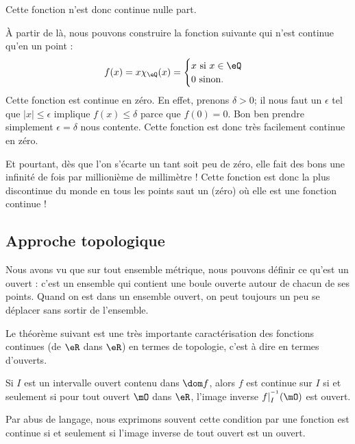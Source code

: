 Cette fonction n'est donc continue nulle part. 

À partir de là, nous pouvons construire la fonction suivante qui n'est continue qu'en un point :
\[ 
  f(x)=x\chi_{\eQ}(x)=
\begin{cases}
x\text{ si $x\in\eQ$}\\
0\text{ sinon.}
\end{cases}
\]
Cette fonction est continue en zéro. En effet, prenons $\delta>0$; il nous faut un $\epsilon$ tel que $| x |\leq\epsilon$ implique $f(x)\leq \delta$ parce que $f(0)=0$. Bon ben prendre simplement $\epsilon=\delta$ nous contente. Cette fonction est donc très facilement continue en zéro.

Et pourtant, dès que l'on s'écarte un tant soit peu de zéro, elle fait des bons une infinité de fois par millionième de millimètre ! Cette fonction est donc la plus discontinue du monde en tous les points saut un (zéro) où elle est une fonction continue !

\subsection{Approche topologique}

Nous avons vu que sur tout ensemble métrique, nous pouvons définir ce qu'est un ouvert : c'est un ensemble qui contient une boule ouverte autour de chacun de ses points. Quand on est dans un ensemble ouvert, on peut toujours un peu se déplacer sans sortir de l'ensemble.

Le théorème suivant est une très importante caractérisation des fonctions continues (de $\eR$ dans $\eR$) en termes de topologie, c'est à dire en termes d'ouverts.

\begin{theorem}     \label{ThoContInvOuvert}
Si $I$ est un intervalle ouvert contenu dans $\dom f$, alors $f$ est continue sur $I$ si et seulement si pour tout ouvert $\mO$ dans $\eR$, l'image inverse $f|_I^{^{-1}}(\mO)$ est ouvert.
\end{theorem}

Par abus de langage, nous exprimons souvent cette condition par \og une fonction est continue si et seulement si l'image inverse de tout ouvert est un ouvert\fg.


